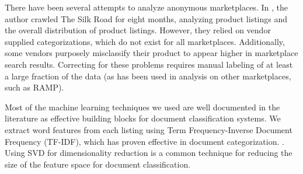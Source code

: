 There have been several attempts to analyze anonymous marketplaces\cite{gwern-silkroad}\cite{christin-silkroad}.
In \cite{christin-silkroad}, the author crawled The Silk Road for eight months, analyzing product listings and the overall distribution of product listings.
However, they relied on vendor supplied categorizations, which do not exist for all marketplaces.
Additionally, some vendors purposely misclassify their product to appear higher in marketplace search results.
Correcting for these problems requires manual labeling of at least a large fraction of the data (as has been used in analysis on other marketplaces, such as RAMP).

Most of the machine learning techniques we used are well documented in the literature as effective building blocks for document classification systems.
We extract word features from each listing using Term Frequency-Inverse Document Frequency (TF-IDF),
which has proven effective in document categorization. \cite[p. 118]{manning}.
Using SVD for dimensionality reduction is a common technique for reducing the size of the feature space for document classification\cite{sun2004supervised}.

